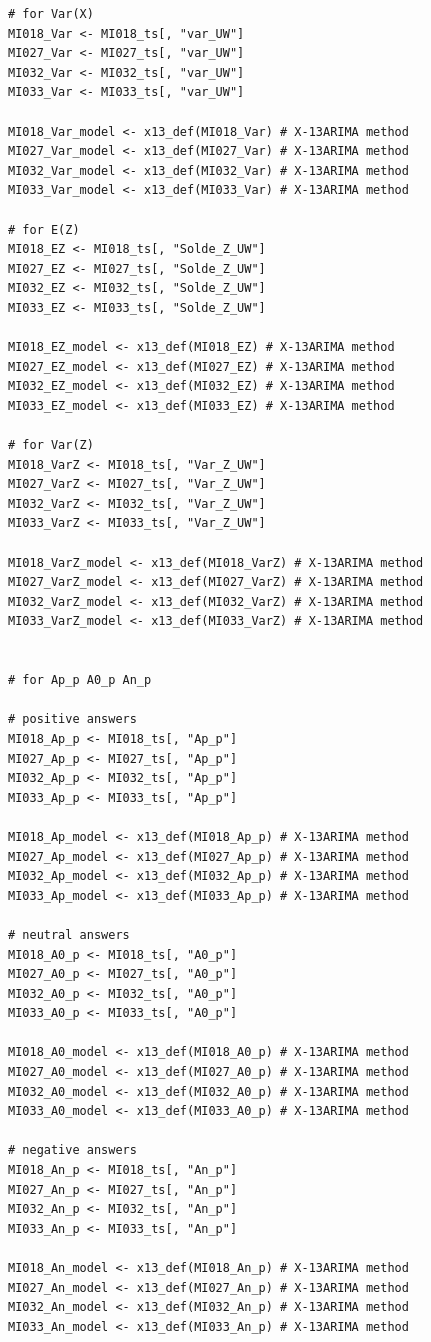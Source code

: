 \documentclass[12pt,a4paper,oneside]{book}
\begin{document}
\begin{lstlisting}
# for Var(X)
MI018_Var <- MI018_ts[, "var_UW"]
MI027_Var <- MI027_ts[, "var_UW"]
MI032_Var <- MI032_ts[, "var_UW"]
MI033_Var <- MI033_ts[, "var_UW"]

MI018_Var_model <- x13_def(MI018_Var) # X-13ARIMA method
MI027_Var_model <- x13_def(MI027_Var) # X-13ARIMA method
MI032_Var_model <- x13_def(MI032_Var) # X-13ARIMA method
MI033_Var_model <- x13_def(MI033_Var) # X-13ARIMA method

# for E(Z)
MI018_EZ <- MI018_ts[, "Solde_Z_UW"]
MI027_EZ <- MI027_ts[, "Solde_Z_UW"]
MI032_EZ <- MI032_ts[, "Solde_Z_UW"]
MI033_EZ <- MI033_ts[, "Solde_Z_UW"]

MI018_EZ_model <- x13_def(MI018_EZ) # X-13ARIMA method
MI027_EZ_model <- x13_def(MI027_EZ) # X-13ARIMA method
MI032_EZ_model <- x13_def(MI032_EZ) # X-13ARIMA method
MI033_EZ_model <- x13_def(MI033_EZ) # X-13ARIMA method

# for Var(Z)
MI018_VarZ <- MI018_ts[, "Var_Z_UW"]
MI027_VarZ <- MI027_ts[, "Var_Z_UW"]
MI032_VarZ <- MI032_ts[, "Var_Z_UW"]
MI033_VarZ <- MI033_ts[, "Var_Z_UW"]

MI018_VarZ_model <- x13_def(MI018_VarZ) # X-13ARIMA method
MI027_VarZ_model <- x13_def(MI027_VarZ) # X-13ARIMA method
MI032_VarZ_model <- x13_def(MI032_VarZ) # X-13ARIMA method
MI033_VarZ_model <- x13_def(MI033_VarZ) # X-13ARIMA method


# for Ap_p A0_p An_p

# positive answers
MI018_Ap_p <- MI018_ts[, "Ap_p"]
MI027_Ap_p <- MI027_ts[, "Ap_p"]
MI032_Ap_p <- MI032_ts[, "Ap_p"]
MI033_Ap_p <- MI033_ts[, "Ap_p"]

MI018_Ap_model <- x13_def(MI018_Ap_p) # X-13ARIMA method
MI027_Ap_model <- x13_def(MI027_Ap_p) # X-13ARIMA method
MI032_Ap_model <- x13_def(MI032_Ap_p) # X-13ARIMA method
MI033_Ap_model <- x13_def(MI033_Ap_p) # X-13ARIMA method

# neutral answers
MI018_A0_p <- MI018_ts[, "A0_p"]
MI027_A0_p <- MI027_ts[, "A0_p"]
MI032_A0_p <- MI032_ts[, "A0_p"]
MI033_A0_p <- MI033_ts[, "A0_p"]

MI018_A0_model <- x13_def(MI018_A0_p) # X-13ARIMA method
MI027_A0_model <- x13_def(MI027_A0_p) # X-13ARIMA method
MI032_A0_model <- x13_def(MI032_A0_p) # X-13ARIMA method
MI033_A0_model <- x13_def(MI033_A0_p) # X-13ARIMA method

# negative answers
MI018_An_p <- MI018_ts[, "An_p"]
MI027_An_p <- MI027_ts[, "An_p"]
MI032_An_p <- MI032_ts[, "An_p"]
MI033_An_p <- MI033_ts[, "An_p"]

MI018_An_model <- x13_def(MI018_An_p) # X-13ARIMA method
MI027_An_model <- x13_def(MI027_An_p) # X-13ARIMA method
MI032_An_model <- x13_def(MI032_An_p) # X-13ARIMA method
MI033_An_model <- x13_def(MI033_An_p) # X-13ARIMA method



\end{lstlisting}
\end{document}
